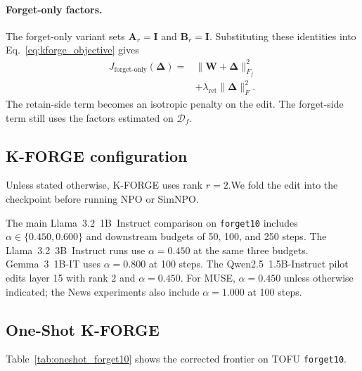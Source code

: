 \documentclass[11pt]{article}
\begin{document}
\paragraph{Forget-only factors.}
The forget-only variant sets $\mathbf{A}_r=\mathbf{I}$ and $\mathbf{B}_r=\mathbf{I}$.
Substituting these identities into Eq.~\ref{eq:kforge_objective} gives
\begin{equation}
\begin{aligned}
    J_{\mathrm{forget\text{-}only}}(\mathbf{\Delta})
    ={}&\lVert\mathbf{W}+\mathbf{\Delta}\rVert_{F_f}^{2} \\
    &+\lambda_{\mathrm{ret}}\lVert\mathbf{\Delta}\rVert_F^{2}.
\end{aligned}
\end{equation}
The retain-side term becomes an isotropic penalty on the edit. The forget-side term still uses the factors estimated on $\mathcal{D}_f$.

\subsection{K-FORGE configuration}

Unless stated otherwise, K-FORGE uses rank $r=2$.We fold the edit into the checkpoint before running NPO or SimNPO.

The main Llama~3.2~1B~Instruct comparison on \texttt{forget10} includes $\alpha\in\{0.450,0.600\}$ and downstream budgets of 50, 100, and 250 steps.
The Llama~3.2~3B~Instruct runs use $\alpha=0.450$ at the same three budgets.
Gemma~3~1B-IT uses $\alpha=0.800$ at 100 steps.
The Qwen2.5~1.5B-Instruct pilot edits layer 15 with rank $2$ and $\alpha=0.450$.
For MUSE, $\alpha=0.450$ unless otherwise indicated; the News experiments also include $\alpha=1.000$ at 100 steps.

\subsection{One-Shot K-FORGE}
\label{sec:oneshot_kforge}

Table~\ref{tab:oneshot_forget10} shows the corrected frontier on TOFU \texttt{forget10}.
\end{document}
